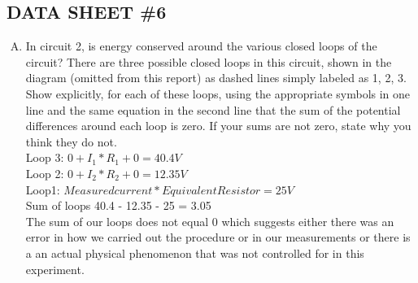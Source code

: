 \subsection{DATA SHEET \#6}
	\begin{enumerate}[A.]
		\item In circuit 2, is energy conserved around the various closed loops of the circuit?  There are three possible closed loops in this circuit, shown in the diagram (omitted from this report) as dashed lines simply labeled as 1, 2, 3.  Show explicitly, for each of these loops, using the appropriate symbols in one line and the same equation in the second line that the sum of the potential differences around each loop is zero.  If your sums are not zero, state why you think they do not.\\ 
		
	Loop 3: $0 + I_1 * R_1 + 0 =  40.4 V$\\
	Loop 2: $0 + I_2 * R_2 + 0 = 12.35 V$\\
	Loop1: $Measured current * Equivalent Resistor = 25V$\\
	
	Sum of loops 40.4 - 12.35 - 25 = 3.05\\
	
	The sum of our loops does not equal 0 which suggests either there was an error in how we carried out the procedure or in our measurements or there is a an actual physical phenomenon that was not controlled for in this experiment.
	
	\end{enumerate}